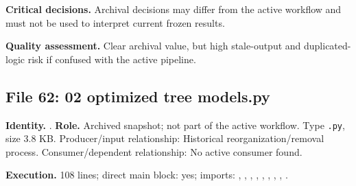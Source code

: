 \documentclass[
  11pt,
  a4paper]{article}
\begin{document}
\textbf{Critical decisions.} Archival decisions may differ from the
active workflow and must not be used to interpret current frozen
results.

\textbf{Quality assessment.} Clear archival value, but high stale-output
and duplicated-logic risk if confused with the active pipeline.

\subsection{File 62: 02 optimized tree
models.py}\label{file-1705104470683336785}

\textbf{Identity.}
.
\textbf{Role.} Archived snapshot; not part of the active workflow. Type
\texttt{.py}, size 3.8 KB. Producer/input relationship: Historical
reorganization/removal process. Consumer/dependent relationship: No
active consumer found.

\textbf{Execution.} 108 lines; direct main block: yes; imports:
, ,
,
,
,
,
,
, .
\end{document}
